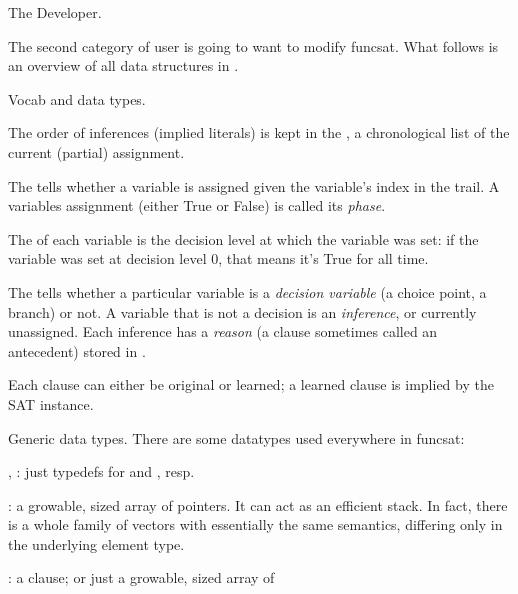 The Developer.

The second category of user is going to want to modify funcsat. What follows is
an overview of all data structures in \funcsat.


\fi

Vocab and data types.

\numberedlist

\li The order of inferences (implied literals) is kept in the ,
a chronological list of the current (partial) assignment.

\li The  tells whether a variable is assigned
given the
variable's index in the trail. A variables assignment (either True or False) is
called its {\it phase}.

\li The  of each variable is the decision level
at which the
variable was set: if the variable was set at decision level 0, that means it's
True for all time.

\li The  tells whether a particular
variable is a
{\it decision variable} (a choice point, a branch) or not. A variable that is
not a decision is an {\it inference}, or currently unassigned. Each inference
has a {\it reason} (a clause sometimes called an antecedent) stored in
.

\li Each clause can either be original or learned; a learned clause is implied
by the SAT instance.

\endnumberedlist

\fi

Generic data types. There are some datatypes used everywhere in funcsat:

\unorderedlist

\li {}, : just typedefs for 
and , resp.

\li {}: a growable, sized array of pointers. It can act as an
efficient
 stack. In fact, there is a whole family of vectors with essentially
the same semantics, differing only in the underlying element type.

\li {}: a clause; or just a growable, sized array of 

